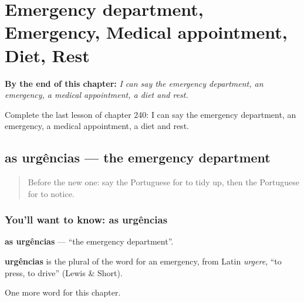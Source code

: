 
\chapter{Emergency department, Emergency, Medical appointment, Diet, Rest}
\label{ch:pt-emergency-department-emergency-medical-appointment-diet-rest}

\begin{chapteropening}
\textbf{By the end of this chapter:} \emph{I can say the emergency department, an emergency, a medical appointment, a diet and rest.}

Complete the last lesson of chapter 240: I can say the emergency department, an emergency, a medical appointment, a diet and rest.
\end{chapteropening}

\section[as urgências]{as urgências — the emergency department}

\label{lesson:PT-C240-urgencias}



\begin{quote}
Before the new one: say the Portuguese for to tidy up, then the Portuguese for to notice.
\end{quote}

\subsection*{You'll want to know: as urgências}
\textbf{as urgências} — \textquotedblleft{}the emergency department\textquotedblright{}.

\begin{cousinweb}
\textbf{urgências} is the plural of the word for an emergency, from Latin \emph{urgere}, \textquotedblleft{}to press, to drive\textquotedblright{} (Lewis \& Short).
\end{cousinweb}

\begin{grammarlens}[title={What you've built}]
One more word for this chapter.
\end{grammarlens}

